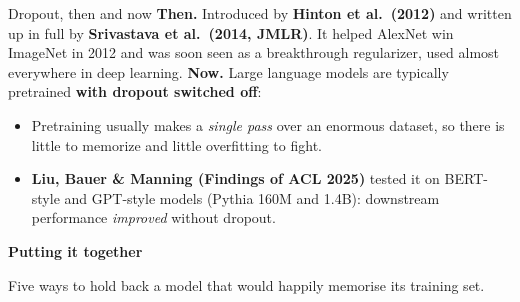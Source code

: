 \documentclass[aspectratio=43]{beamer}
\begin{document}
\begin{frame}{Dropout, then and now}
  \small
  \textbf{Then.} Introduced by \textbf{Hinton et al.\ (2012)} and written up in full by
  \textbf{Srivastava et al.\ (2014, JMLR)}. It helped AlexNet win ImageNet in 2012 and was soon
  seen as a breakthrough regularizer, used almost everywhere in deep learning.
  \vskip 4pt
  {\small \textbf{Now.} Large language models are typically pretrained \textbf{with dropout
  switched off}:}
  \begin{itemize}\small
    \item Pretraining usually makes a \emph{single pass} over an enormous dataset, so there is
      little to memorize and little overfitting to fight.
    \item \textbf{Liu, Bauer \& Manning (Findings of ACL 2025)} tested it on BERT-style and
      GPT-style models (Pythia 160M and 1.4B): downstream performance \emph{improved} without
      dropout.
  \end{itemize}
  \vskip 3pt
\end{frame}

\begin{frame}[plain]
  \vfill
  \begin{center}
    {\Large\color{popblue}\textbf{Putting it together}}\\[0.9em]
    \begin{minipage}{0.82\textwidth}\centering\small
      Five ways to hold back a model that would happily memorise its training set.
    \end{minipage}
  \end{center}
  \vfill
\end{frame}
\end{document}
